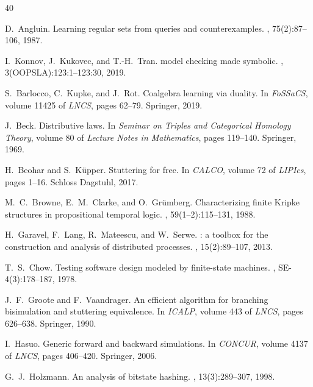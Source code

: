 \documentclass[11pt]{article}
\begin{document}
\begin{thebibliography}{40}

D.~Angluin.
\newblock Learning regular sets from queries and counterexamples.
, 75(2):87--106, 1987.

I.~Konnov, J.~Kukovec, and T.-H.~Tran.
 model checking made symbolic.
, 3(OOPSLA):123:1--123:30, 2019.

S.~Barlocco, C.~Kupke, and J.~Rot.
\newblock Coalgebra learning via duality.
\newblock In {\em FoSSaCS}, volume 11425 of {\em LNCS}, pages 62--79.
  Springer, 2019.

J.~Beck.
\newblock Distributive laws.
\newblock In {\em Seminar on Triples and Categorical Homology Theory},
  volume 80 of {\em Lecture Notes in Mathematics}, pages 119--140. Springer,
  1969.

H.~Beohar and S.~K{\"u}pper.
\newblock Stuttering for free.
\newblock In {\em CALCO}, volume 72 of {\em LIPIcs}, pages 1--16. Schloss
  Dagstuhl, 2017.

M.~C.~Browne, E.~M.~Clarke, and O.~Gr{\"u}mberg.
\newblock Characterizing finite {K}ripke structures in propositional temporal
  logic.
, 59(1--2):115--131, 1988.

H.~Garavel, F.~Lang, R.~Mateescu, and W.~Serwe.
: a toolbox for the construction and analysis of
  distributed processes.
, 15(2):89--107, 2013.

T.~S.~Chow.
\newblock Testing software design modeled by finite-state machines.
, SE-4(3):178--187,
  1978.

J.~F.~Groote and F.~Vaandrager.
\newblock An efficient algorithm for branching bisimulation and stuttering
  equivalence.
\newblock In {\em ICALP}, volume 443 of {\em LNCS}, pages 626--638. Springer,
  1990.

I.~Hasuo.
\newblock Generic forward and backward simulations.
\newblock In {\em CONCUR}, volume 4137 of {\em LNCS}, pages 406--420. Springer,
  2006.

G.~J.~Holzmann.
\newblock An analysis of bitstate hashing.
, 13(3):289--307, 1998.


\end{thebibliography}
\end{document}
